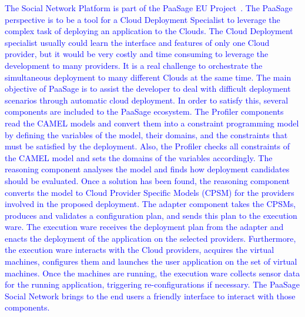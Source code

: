 \textcolor{blue}{The Social Network Platform is part of the PaaSage EU Project~\cite{paasage}.
The PaaSage perspective is to be a tool for a Cloud Deployment Specialist to leverage the complex task of deploying an application to the Clouds. The Cloud Deployment specialist usually could learn the interface and features of only one Cloud provider, but it would be very costly and time consuming to leverage the development to many providers. It is a real challenge to orchestrate the simultaneous deployment to many different Clouds at the same time. The main objective of PaaSage is to assist the developer to deal with difficult deployment scenarios through automatic cloud deployment. In order to satisfy this, several components are included to the PaaSage ecosystem. The Profiler components read the CAMEL models and convert them into a constraint programming model by defining the variables of the model, their domains, and the constraints that must be satisfied by the deployment. Also, the Profiler checks all constraints of the CAMEL model and sets the domains of the variables accordingly. The reasoning component analyses the model and finds how deployment candidates should be evaluated. Once a solution has been found, the reasoning component converts the model to Cloud Provider Specific Models (CPSM) for the providers involved in the proposed deployment. The adapter component takes the CPSMs, produces and validates a configuration plan, and sends this plan to the execution ware. The execution ware receives the deployment plan from the adapter and enacts the deployment of the application on the selected providers. Furthermore, the execution ware interacts with the Cloud providers, acquires the virtual machines, configures them and launches the user application on the set of virtual machines. Once the machines are running, the execution ware collects sensor data for the running application, triggering re-configurations if necessary.}
\textcolor{blue}{The PaaSage Social Network brings to the end users a friendly interface to interact with those components.}



